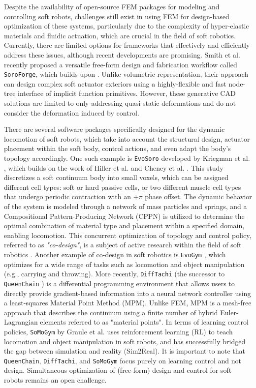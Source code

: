 Despite the availability of open-source FEM packages for modeling and controlling soft robots, challenges still exist in using FEM for design-based optimization of these systems, particularly due to the complexity of hyper-elastic materials and fluidic actuation, which are crucial in the field of soft robotics. Currently, there are limited options for frameworks that effectively and efficiently address these issues, although recent developments are promising. Smith et al. \cite{Smith2023Feb} recently proposed a versatile free-form design and fabrication workflow called \texttt{SoroForge}, which builds upon \cite{Smith2022_FEM,Smith2022}. Unlike volumetric representation, their approach can design complex soft actuator exteriors using a highly-flexible and fast node-tree interface of implicit function primitives. However, these generative CAD solutions are limited to only addressing quasi-static deformations and do not consider the deformation induced by control.

There are several software packages specifically designed for the dynamic locomotion of soft robots, which take into account the structural design, actuator placement within the soft body, control actions, and even adapt the body's topology accordingly. One such example is \texttt{EvoSoro} developed by Kriegman et al. \cite{Kriegman2020}, which builds on the work of Hiller et al. \cite{Hiller2014} and Cheney et al. \cite{Cheney2013}. This study discretizes a soft continuum body into small voxels, which can be assigned different cell types: soft or hard passive cells, or two different muscle cell types that undergo periodic contraction with an $+\pi$ phase offset. The dynamic behavior of the system is modeled through a network of mass particles and springs, and a Compositional Pattern-Producing Network (CPPN) is utilized to determine the optimal combination of material type and placement within a specified domain, enabling locomotion. This concurrent optimization of topology and control policy, referred to as \emph{"co-design"}, is a subject of active research within the field of soft robotics \cite{Xavier2022Jun}. Another example of co-design in soft robotics is \texttt{EvoGym} \cite{Bhatia2022}, which optimizes for a wide range of tasks such as locomotion and object manipulation (e.g., carrying and throwing). More recently, \texttt{DiffTachi} (the successor to \texttt{QueenChain} \cite{Hu2019May}) is a differential programming environment that allows users to directly provide gradient-based information into a neural network controller using a least-squares Material Point Method (MPM). Unlike FEM, MPM is a mesh-free approach that describes the continuum using a finite number of hybrid Euler-Lagrangian elements referred to as "material points". In terms of learning control policies, \texttt{SoMoGym} by Graule et al. \cite{Graule2022} uses reinforcement learning (RL) to teach locomotion and object manipulation in soft robots, and has successfully bridged the gap between simulation and reality (Sim2Real). It is important to note that \texttt{QueenChain}, \texttt{DiffTachi}, and \texttt{SoMoGym} focus purely on learning control and not design. Simultaneous optimization of (free-form) design and control for soft robots remains an open challenge.

